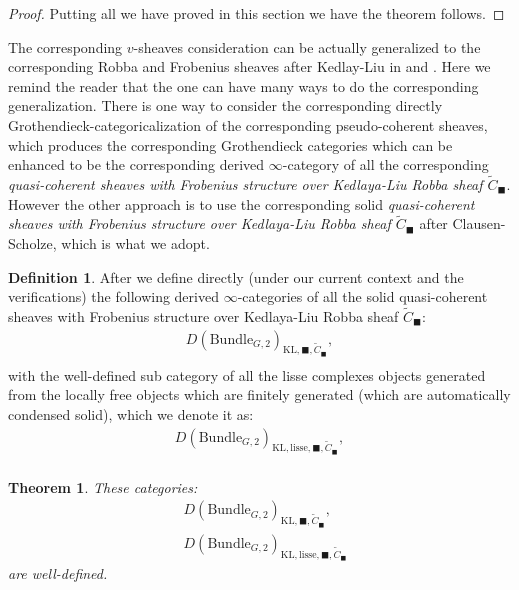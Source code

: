 \documentclass[12pt]{book}
\newtheorem{theorem}{Theorem}
\theoremstyle{definition}
\newtheorem{definition}{Definition}
\begin{document}
\begin{proof}
Putting all we have proved in this section we have the theorem follows.
\end{proof}

\noindent The corresponding $v$-sheaves consideration can be actually generalized to the corresponding Robba and Frobenius sheaves after Kedlay-Liu in \cite{KLII} and \cite{KLI}. Here we remind the reader that the one can have many ways to do the corresponding generalization. There is one way to consider the corresponding directly Grothendieck-categoricalization of the corresponding pseudo-coherent sheaves, which produces the corresponding Grothendieck categories which can be enhanced to be the corresponding derived $\infty$-category of all the corresponding \textit{quasi-coherent sheaves with Frobenius structure over Kedlaya-Liu Robba sheaf $\widetilde{C}_\blacksquare$}. However the other approach is to use the corresponding solid \textit{quasi-coherent sheaves with Frobenius structure over Kedlaya-Liu Robba sheaf $\widetilde{C}_\blacksquare$} after Clausen-Scholze, which is what we adopt.

\begin{definition}
After \cite{FS} we define directly (under our current context and the verifications) the following derived $\infty$-categories of all the solid quasi-coherent sheaves with Frobenius structure over Kedlaya-Liu Robba sheaf $\widetilde{C}_\blacksquare$:
\begin{align}
D(\mathrm{Bundle}_{G,2})_{\text{KL},\blacksquare,\widetilde{C}_\blacksquare},\\
\end{align}
with the well-defined sub category of all the lisse complexes objects generated from the locally free objects which are finitely generated (which are automatically condensed solid), which we denote it as:
\begin{align}
D(\mathrm{Bundle}_{G,2})_{\text{KL},\mathrm{lisse},\blacksquare,\widetilde{C}_\blacksquare},\\
\end{align}
\end{definition}

\begin{theorem}
These categories:
\begin{align}
&D(\mathrm{Bundle}_{G,2})_{\text{KL},\blacksquare,\widetilde{C}_\blacksquare},\\
&D(\mathrm{Bundle}_{G,2})_{\text{KL},\mathrm{lisse},\blacksquare,\widetilde{C}_\blacksquare}
\end{align}
are well-defined.
\end{theorem}
\end{document}
